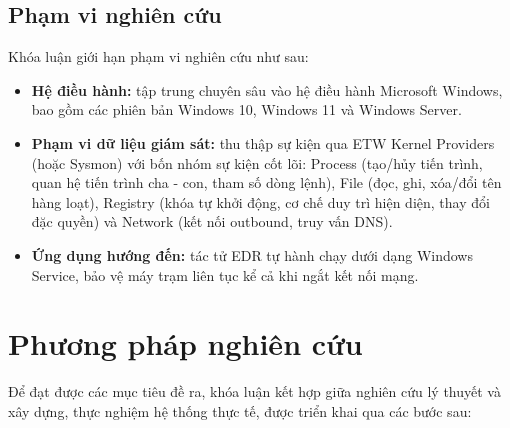 \subsection{Phạm vi nghiên cứu}

Khóa luận giới hạn phạm vi nghiên cứu như sau:

\begin{itemize}
    \item \textbf{Hệ điều hành:} tập trung chuyên sâu vào hệ điều hành Microsoft Windows, bao gồm các phiên bản Windows 10, Windows 11 và Windows Server.
    \item \textbf{Phạm vi dữ liệu giám sát:} thu thập sự kiện qua ETW Kernel Providers (hoặc Sysmon) với bốn nhóm sự kiện cốt lõi: Process (tạo/hủy tiến trình, quan hệ tiến trình cha - con, tham số dòng lệnh), File (đọc, ghi, xóa/đổi tên hàng loạt), Registry (khóa tự khởi động, cơ chế duy trì hiện diện, thay đổi đặc quyền) và Network (kết nối outbound, truy vấn DNS).
    \item \textbf{Ứng dụng hướng đến:} tác tử EDR tự hành chạy dưới dạng Windows Service, bảo vệ máy trạm liên tục kể cả khi ngắt kết nối mạng.
\end{itemize}

\section{Phương pháp nghiên cứu}

Để đạt được các mục tiêu đề ra, khóa luận kết hợp giữa nghiên cứu lý thuyết và xây dựng, thực nghiệm hệ thống thực tế, được triển khai qua các bước sau:

